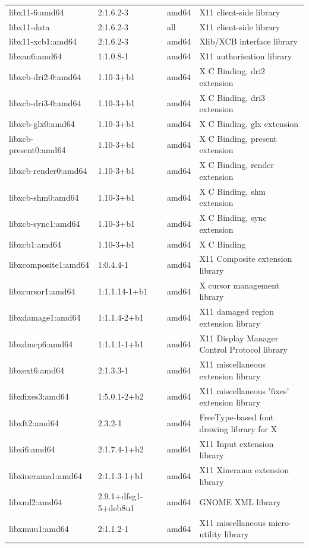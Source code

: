 \documentclass[a4paper,10pt]{article}
\begin{document}
\begin{appendices}
{\begin{longtable}{p{3.25cm}@{\hspace{0.25cm}}p{4cm}@{\hspace{0.25cm}}l@{\hspace{0.25cm}}p{7cm}}
libx11-6:amd64	&	2:1.6.2-3	&	amd64	&	X11 client-side library	\\
libx11-data	&	2:1.6.2-3	&	all	&	X11 client-side library	\\
libx11-xcb1:amd64	&	2:1.6.2-3	&	amd64	&	Xlib/XCB interface library	\\
libxau6:amd64	&	1:1.0.8-1	&	amd64	&	X11 authorisation library	\\
libxcb-dri2-0:amd64	&	1.10-3+b1	&	amd64	&	X C Binding, dri2 extension	\\
libxcb-dri3-0:amd64	&	1.10-3+b1	&	amd64	&	X C Binding, dri3 extension	\\
libxcb-glx0:amd64	&	1.10-3+b1	&	amd64	&	X C Binding, glx extension	\\
libxcb-present0:amd64	&	1.10-3+b1	&	amd64	&	X C Binding, present extension	\\
libxcb-render0:amd64	&	1.10-3+b1	&	amd64	&	X C Binding, render extension	\\
libxcb-shm0:amd64	&	1.10-3+b1	&	amd64	&	X C Binding, shm extension	\\
libxcb-sync1:amd64	&	1.10-3+b1	&	amd64	&	X C Binding, sync extension	\\
libxcb1:amd64	&	1.10-3+b1	&	amd64	&	X C Binding	\\
libxcomposite1:amd64	&	1:0.4.4-1	&	amd64	&	X11 Composite extension library	\\
libxcursor1:amd64	&	1:1.1.14-1+b1	&	amd64	&	X cursor management library	\\
libxdamage1:amd64	&	1:1.1.4-2+b1	&	amd64	&	X11 damaged region extension library	\\
libxdmcp6:amd64	&	1:1.1.1-1+b1	&	amd64	&	X11 Display Manager Control Protocol library	\\
libxext6:amd64	&	2:1.3.3-1	&	amd64	&	X11 miscellaneous extension library	\\
libxfixes3:amd64	&	1:5.0.1-2+b2	&	amd64	&	X11 miscellaneous 'fixes' extension library	\\
libxft2:amd64	&	2.3.2-1	&	amd64	&	FreeType-based font drawing library for X	\\
libxi6:amd64	&	2:1.7.4-1+b2	&	amd64	&	X11 Input extension library	\\
libxinerama1:amd64	&	2:1.1.3-1+b1	&	amd64	&	X11 Xinerama extension library	\\
libxml2:amd64	&	2.9.1+dfsg1-5+deb8u1	&	amd64	&	GNOME XML library	\\
libxmuu1:amd64	&	2:1.1.2-1	&	amd64	&	X11 miscellaneous micro-utility library	\\

\end{longtable}}
\end{appendices}
\end{document}

